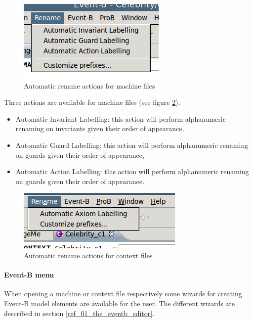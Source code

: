 \begin{figure}[!h]
\begin{center}
	\includegraphics{img/reference/ref_01_menubar1.png}
	\caption{Automatic rename actions for machine files}
	\label{fig_ref_01_menubar1}
\end{center}
\end{figure}

Three actions are available for machine files (see figure \ref{fig_ref_01_menubar2}).

    \begin{itemize}
    	\item Automatic Invariant Labelling: this action will perform alphanumeric renaming on invariants given their order of appearance,
	\item Automatic Guard Labelling: this action will perform alphanumeric renaming on guards given their order of appearance,
	\item Automatic Action Labelling: this action will perform alphanumeric renaming on guards given their order of appearance. 
    \end{itemize}

\begin{figure}[!h]
\begin{center}
	\includegraphics{img/reference/ref_01_menubar2.png}
	\caption{Automatic rename actions for context files}
	\label{fig_ref_01_menubar2}
\end{center}
\end{figure}

\paragraph{Event-B menu}

When opening a machine or context file respectively some wizards for creating Event-B model elements are available for the user. The different wizards are described in section \ref{ref_01_the_eventb_editor}.


